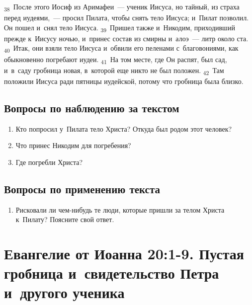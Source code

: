 \documentclass[a4paper,12pt]{article}
\begin{document}
\textsubscript{38}~После этого Иосиф из Аримафеи~--- ученик Иисуса, но тайный, из страха перед иудеями,~--- просил Пилата, чтобы снять тело Иисуса; и~Пилат позволил. Он пошел и~снял тело Иисуса. \textsubscript{39}~Пришел также и~Никодим, приходивший прежде к~Иисусу ночью, и~принес состав из смирны и~алоэ~--- литр около ста. \textsubscript{40}~Итак, они взяли тело Иисуса и~обвили его пеленами с~благовониями, как обыкновенно погребают иудеи. \textsubscript{41}~На том месте, где Он распят, был сад, и~в~саду гробница новая, в~которой еще никто не был положен. \textsubscript{42}~Там положили Иисуса ради пятницы иудейской, потому что гробница была близко.

\subsection*{Вопросы по наблюдению за текстом}
\begin{enumerate}
    \item Кто попросил у~Пилата тело Христа? Откуда был родом этот человек? 
    
    \myline
    
    \myline
    \item Что принес Никодим для погребения? 
    
    \myline
    
    \myline
    \item Где погребли Христа? 
    
    \myline
    
    \myline
\end{enumerate}

\subsection*{Вопросы по применению текста} 
\begin{enumerate}
    \item Рисковали ли чем-нибудь те люди, которые пришли за телом Христа к~Пилату? Поясните свой ответ. 
    
    \myline
    
    \myline
\end{enumerate}



\section{Евангелие от Иоанна 20:1-9. Пустая гробница и~свидетельство Петра и~другого ученика}
\end{document}
